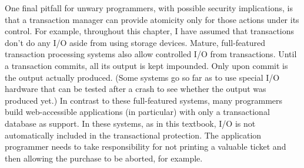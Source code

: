 One final pitfall for unwary programmers, with possible security
implications, is that a transaction manager can provide atomicity only 
for those actions under its control.  For example, throughout this
chapter, I have assumed that
transactions don't do any I/O aside from using storage devices.  Mature, full-featured transaction
processing systems also allow controlled I/O from transactions.  Until
a transaction commits, all its output is kept impounded.
Only upon commit is the output actually produced.  (Some systems go so
far as to use special I/O hardware that can be tested after a crash to
see whether the output was produced yet.)  In contrast to these
full-featured systems, many programmers build web-accessible
applications (in particular) with only a transactional database as
support.  In these systems, as in this textbook, I/O is not
automatically included in the transactional protection.  The
application programmer needs to take responsibility for not printing a
valuable ticket and then allowing the purchase to be aborted, for
example.

